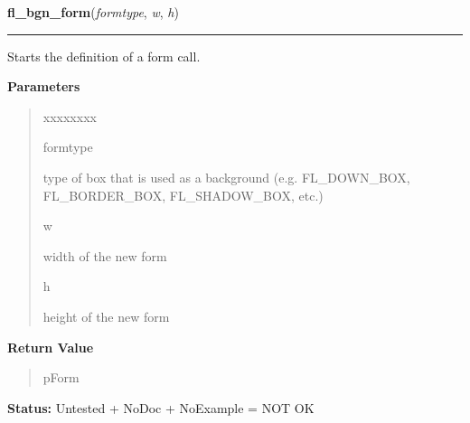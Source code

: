     \label{xformslib:library:fl_bgn_form}

    \vspace{0.5ex}

\hspace{.8\funcindent}\begin{boxedminipage}{\funcwidth}

    \raggedright \textbf{fl\_bgn\_form}(\textit{formtype}, \textit{w}, \textit{h})

    \vspace{-1.5ex}

    \rule{\textwidth}{0.5\fboxrule}
\setlength{\parskip}{2ex}
    Starts the definition of a form call.

\setlength{\parskip}{1ex}
      \textbf{Parameters}
      \vspace{-1ex}

      \begin{quote}
        \begin{Ventry}{xxxxxxxx}

          \item[formtype]

          type of box that is used as a background (e.g. FL\_DOWN\_BOX, 
          FL\_BORDER\_BOX, FL\_SHADOW\_BOX, etc.)

          \item[w]

          width of the new form

          \item[h]

          height of the new form

        \end{Ventry}

      \end{quote}

      \textbf{Return Value}
    \vspace{-1ex}

      \begin{quote}
      pForm

      \end{quote}

\textbf{Status:} Untested + NoDoc + NoExample = NOT OK



    \end{boxedminipage}

    \label{xformslib:library:fl_end_form}

